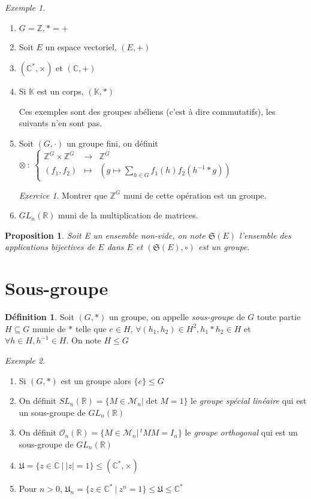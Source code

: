 \documentclass[]{article}
\newtheorem{myproposition}{Proposition}
\theoremstyle{remark}
\newtheorem{myexer}{Exercice}
\newtheorem{myexmpl}{Exemple}
\theoremstyle{definition}
\newtheorem{mydef}{Définition}
\newcommand{\func}[5]{
#1 ~ : ~ \left\{ \begin{array}{lcl}
	#2 & \longrightarrow & #3 \\
	#4 & \longmapsto & #5
\end{array}
\right.
}
\begin{document}
\begin{myexmpl}
	\leavevmode
	\begin{enumerate}
		\item $G=\mathbb{Z}, *=+$
		\item Soit $E$ un espace vectoriel, $(E, +)$
		\item $(\mathbb{C}^*, \times)$ et $(\mathbb{C}, +)$
		\item Si $\mathbb{K}$ est un corps, $(\mathbb{K}, *)$

		Ces exemples sont des groupes abéliens (c'est à dire commutatifs), les suivants n'en sont pas.
		
		\item Soit $(G, \cdot)$ un groupe fini, on définit $\func{\otimes}{\mathbb{Z}^G \times \mathbb{Z}^G}{\mathbb{Z}^G}{(f_1,f_2)}{\left(g \longmapsto \displaystyle \sum_{h \in G} f_1(h)f_2(h^{-1}*g)\right)}$
		
		\begin{myexer}
			Montrer que $\mathbb{Z}^G$ muni de cette opération est un groupe.
		\end{myexer}
		\item $GL_n(\mathbb{R})$ muni de la multiplication de matrices.
	\end{enumerate}
\end{myexmpl}

\begin{myproposition}
	Soit E un ensemble non-vide, on note $\mathfrak{S}(E)$ l'ensemble des applications bijectives de $E$ dans $E$ et $(\mathfrak{S}(E), \circ)$ est un groupe.
\end{myproposition}

\section{Sous-groupe}

\begin{mydef}
	Soit $(G, *)$ un groupe, on appelle \textit{sous-groupe} de $G$ toute partie $H \subseteq G$ munie de $*$ telle que $e \in H$, $\forall (h_1,h_2) \in H^2, h_1*h_2 \in H$  et $\forall h \in H, h^{-1} \in H$.
	On note $H \leqslant G$
\end{mydef}

\begin{myexmpl}
	\begin{enumerate}
		\item Si $(G, *)$ est un groupe alors $\{e\} \leqslant G$
		\item On définit $SL_n(\mathbb{R})=\{M \in \mathcal{M}_n | \det M = 1\}$ le \textit{groupe spécial linéaire} qui est un sous-groupe de $GL_n(\mathbb{R})$
		\item On définit $\mathcal{O}_n(\mathbb{R})=\{M \in \mathcal{M}_n | \,^tMM = I_n\}$ le \textit{groupe orthogonal} qui est un sous-groupe de $GL_n(\mathbb{R})$
		\item $\mathfrak{U} = \{z \in \mathbb{C} ~ | ~ |z| = 1\} \leqslant (\mathbb{C}^*, \times)$
		\item Pour $n > 0$, $\mathfrak{U}_n = \{z \in \mathbb{C}^* ~ | ~ z^n = 1\} \leqslant \mathfrak{U} \leqslant \mathbb{C}^*$
	\end{enumerate}
\end{myexmpl}
\end{document}
